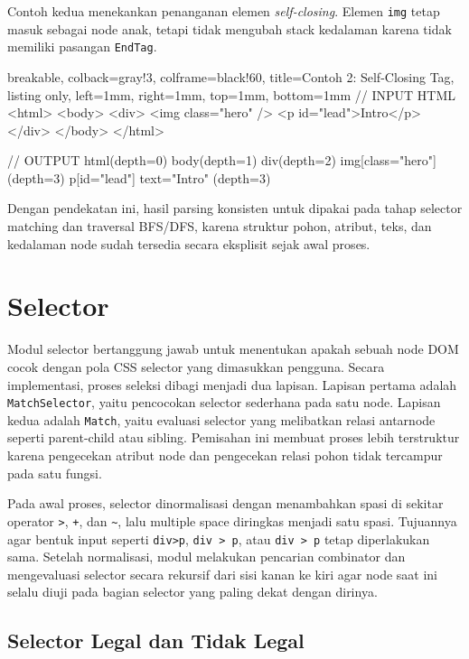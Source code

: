 Contoh kedua menekankan penanganan elemen \textit{self-closing}. Elemen \texttt{img} tetap masuk sebagai node anak, tetapi tidak mengubah stack kedalaman karena tidak memiliki pasangan \texttt{EndTag}.

\begin{tcblisting}{
        breakable,
        colback=gray!3,
        colframe=black!60,
        title=Contoh 2: Self-Closing Tag,
        listing only,
        left=1mm,
        right=1mm,
        top=1mm,
        bottom=1mm
    }
    // INPUT HTML
    <html>
    <body>
    <div>
    <img class="hero" />
    <p id="lead">Intro</p>
    </div>
    </body>
    </html>

    // OUTPUT
    html(depth=0)
    body(depth=1)
    div(depth=2)
    img[class="hero"](depth=3)
    p[id="lead"] text="Intro" (depth=3)
\end{tcblisting}

Dengan pendekatan ini, hasil parsing konsisten untuk dipakai pada tahap selector matching dan traversal BFS/DFS, karena struktur pohon, atribut, teks, dan kedalaman node sudah tersedia secara eksplisit sejak awal proses.

\section{Selector}

Modul selector bertanggung jawab untuk menentukan apakah sebuah node DOM cocok dengan pola CSS selector yang dimasukkan pengguna. Secara implementasi, proses seleksi dibagi menjadi dua lapisan. Lapisan pertama adalah \texttt{MatchSelector}, yaitu pencocokan selector sederhana pada satu node. Lapisan kedua adalah \texttt{Match}, yaitu evaluasi selector yang melibatkan relasi antarnode seperti parent-child atau sibling. Pemisahan ini membuat proses lebih terstruktur karena pengecekan atribut node dan pengecekan relasi pohon tidak tercampur pada satu fungsi.

Pada awal proses, selector dinormalisasi dengan menambahkan spasi di sekitar operator \texttt{>}, \texttt{+}, dan \texttt{\textasciitilde{}}, lalu multiple space diringkas menjadi satu spasi. Tujuannya agar bentuk input seperti \texttt{div>p}, \texttt{div > p}, atau \texttt{div   >    p} tetap diperlakukan sama. Setelah normalisasi, modul melakukan pencarian combinator dan mengevaluasi selector secara rekursif dari sisi kanan ke kiri agar node saat ini selalu diuji pada bagian selector yang paling dekat dengan dirinya.

\subsection{Selector Legal dan Tidak Legal}

